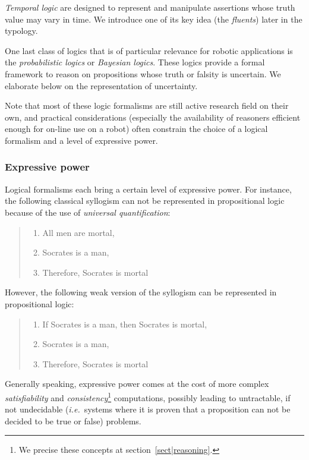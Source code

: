 \documentclass[a4paper, twocolumn]{article}
\newcommand{\ie}{{\textit{i.e.\ }}}
\begin{document}
\emph{Temporal logic} are designed to represent and manipulate assertions whose
truth value may vary in time. We introduce one of its key idea (the
\emph{fluents}) later in the typology.

One last class of logics that is of particular relevance for robotic
applications is the \emph{probabilistic logics} or \emph{Bayesian logics}.
These logics provide a formal framework to reason on propositions whose truth
or falsity is uncertain. We elaborate below on the representation of uncertainty.

Note that most of these logic formalisms are still active research field on
their own, and practical considerations (especially the availability of
reasoners efficient enough for on-line use on a robot) often constrain the
choice of a logical formalism and a level of expressive power.

\subsubsection{Expressive power}

Logical formalisms each bring a certain level of expressive power. For
instance, the following classical syllogism can not be represented in
propositional logic because of the use of \emph{universal quantification}:

\begin{quote}
\begin{enumerate}
    \item All men are mortal,
    \item Socrates is a man,
    \item Therefore, Socrates is mortal
\end{enumerate}
\end{quote}

However, the following weak version of the syllogism can be represented in
propositional logic:

\begin{quote}
\begin{enumerate}
    \item If Socrates is a man, then Socrates is mortal,
    \item Socrates is a man,
    \item Therefore, Socrates is mortal
\end{enumerate}
\end{quote}

Generally speaking, expressive power comes at the cost of more complex
\emph{satisfiability} and \emph{consistency}\footnote{We precise these concepts
at section~\ref{sect|reasoning}.} computations, possibly leading to
untractable, if not undecidable (\ie systems where it is proven that a
proposition can not be decided to be true or false) problems.
\end{document}
